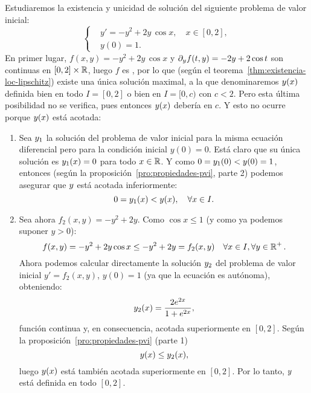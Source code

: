 \begin{example}
  \renewcommand{\tt}{x}
  \label{ex:existencia-unicidad-loc-lipschitz}
  Estudiaremos la existencia y unicidad de solución del siguiente
  problema de valor inicial:
  \begin{equation*}
    \left\{
      \begin{aligned}
        &y' = -y^2+2y\,\cos \tt, \quad \tt\in [0,2],\\
        &y(0)=1.
      \end{aligned}
    \right.
  \end{equation*}
  En primer lugar, $f(x,y)=-y^2+2y\,\cos \tt$ y
  $\partial_y f(t,y)=-2y+2\cos t$ son continuas en $[0,2]\times\operatorname{{\mathbb R}}$, luego
  $f$ es \locLipschitz, por lo que (según el
  teorema~\ref{thm:existencia-loc-lipschitz}) existe una única
  solución maximal, a la que denominaremos $\sol(\tt)$ definida bien
  en todo $I=[0,2]$ o bien en $I=[0,c)$ con $c<2$. Pero esta última
  posibilidad no se verifica, pues entonces $\sol(\tt)$ debería
  en $c$. Y esto no ocurre porque $\sol(\tt)$ está acotada:
  \begin{enumerate}
  \item Sea $y_1$ la solución del problema de valor inicial para la
    misma ecuación diferencial pero para la condición inicial
    $y(0)=0$. Está claro que su única solución es $\sol_1(\tt)=0$
    para todo $\tt\in\Rset$. Y como $0=y_1(0)<y(0)=1$, entonces
    (según la proposición~\ref{pro:propiedades-pvi}, parte 2) podemos
    asegurar que $y$ está acotada inferiormente:
    \begin{equation*}
      0=\sol_1(\tt)<\sol(\tt), \quad \forall \tt\in I.
    \end{equation*}
  \item Sea ahora $f_2(\tt,y)=-y^2+2y$. Como $\cos\tt \le 1$  (y como
    ya podemos suponer $y>0$):
    $$f(\tt,y)=-y^2+2y\cos\tt \le -y^2+2y = f_2(\tt,y)\quad
    \forall \tt\in I, \forall y\in\Rset^+.$$
    Ahora podemos calcular
    directamente la solución $y_2$ del problema de valor inicial
    $y'=f_2(\tt,y)$, $y(0)=1$ (ya que la ecuación es autónoma),
    obteniendo:
    $$
    \sol_2(\tt)=\frac{2e^{2\tt}}{1+e^{2\tt}},
    $$
    función continua y, en consecuencia, acotada superiormente en $[0,2]$.
    Según la proposición~\ref{pro:propiedades-pvi} (parte 1)
    \begin{equation*}
      \sol(\tt)\le\sol_2(\tt),
    \end{equation*}
    luego $\sol(\tt)$ está también acotada superiormente en
    $[0,2]$. Por lo tanto, $y$ está definida en todo $[0,2]$.
  \end{enumerate}
  \renewcommand{\tt}{t}
\end{example}


